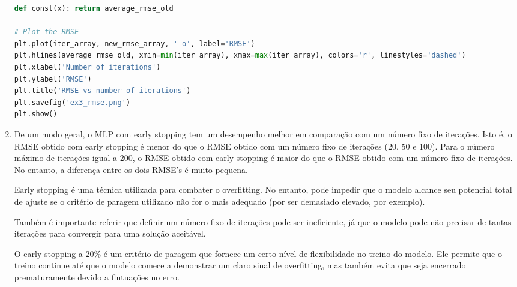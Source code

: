\documentclass[a4paper,12pt]{article} %
\begin{document}
\begin{enumerate}
\begin{lstlisting}[language=Python]
def const(x): return average_rmse_old

# Plot the RMSE
plt.plot(iter_array, new_rmse_array, '-o', label='RMSE')
plt.hlines(average_rmse_old, xmin=min(iter_array), xmax=max(iter_array), colors='r', linestyles='dashed')
plt.xlabel('Number of iterations') 
plt.ylabel('RMSE')
plt.title('RMSE vs number of iterations')
plt.savefig('ex3_rmse.png')
plt.show()
\end{lstlisting}

\item De um modo geral, o MLP com early stopping tem um desempenho melhor em comparação com um número fixo de iterações. Isto é, o RMSE obtido com early stopping é menor do que o RMSE obtido com um número fixo de iterações (20, 50 e 100).
Para o número máximo de iterações igual a 200, o RMSE obtido com early stopping é maior do que o RMSE obtido com um número fixo de iterações. No entanto, a diferença entre os dois RMSE's é muito pequena.

Early stopping é uma técnica utilizada para combater o overfitting. No entanto, pode impedir que o modelo alcance seu potencial total de ajuste se o critério de paragem utilizado não for o mais adequado (por ser demasiado elevado, por exemplo).

Também é importante referir que definir um número fixo de iterações pode ser ineficiente, já que o modelo pode não precisar de tantas iterações para convergir para uma solução aceitável. 

O early stopping a 20\% é um critério de paragem que fornece um certo nível de flexibilidade no treino do modelo. Ele permite que o treino continue até que o modelo comece a demonstrar um claro sinal de overfitting, mas também evita que seja encerrado prematuramente devido a flutuações no erro.

\end{enumerate}
\end{document}
